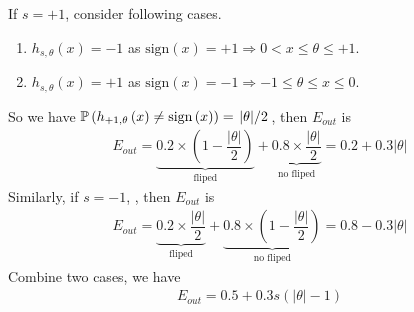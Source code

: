 \documentclass[12pt]{article}
\newcommand{\SBrackets}[1]{\left[#1\right]}
\newcommand{\ParTh}[1]{\left(#1\right)}
\newcommand{\AbsVal}[1]{\left|#1\right|}
\newcommand{\Divide}[2]{\left.#1\middle/#2\right.}
\begin{document}
If $s = +1$, consider following cases.
\begin{enumerate}
\item $h_{s,\theta}\ParTh{x}=-1$ as $\text{sign}\ParTh{x}=+1\Rightarrow 0<x\leq\theta\leq+1$.
\item $h_{s,\theta}\ParTh{x}=+1$ as $\text{sign}\ParTh{x}=-1\Rightarrow -1\leq\theta\leq x\leq0$.
\end{enumerate}

So we have $\mathbb{P}\ParTh{h_{+1,\theta}\ParTh{x}\neq\text{sign}\ParTh{x}}=\Divide{\AbsVal{\theta}}{2}$, then $E_{out}$ is
\begin{align}
E_{out}=\underbrace{ 0.2 \times \ParTh{1-\dfrac{\AbsVal{\theta}}{2}} }_{\text{fliped}}+\underbrace{ 0.8 \times \dfrac{\AbsVal{\theta}}{2} }_{\text{no fliped}}=0.2+0.3\AbsVal{\theta}
\end{align}
Similarly, if $s=-1$, , then $E_{out}$ is
\begin{align}
E_{out}=\underbrace{ 0.2 \times \dfrac{\AbsVal{\theta}}{2} }_{\text{fliped}}+\underbrace{ 0.8 \times \ParTh{1-\dfrac{\AbsVal{\theta}}{2}} }_{\text{no fliped}}=0.8-0.3\AbsVal{\theta}
\end{align}
Combine two cases, we have
\begin{align}
E_{out}=0.5+0.3s\ParTh{\AbsVal{\theta}-1}
\end{align}
\end{document}

